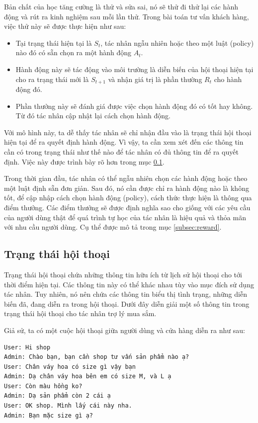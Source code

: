 Bản chất của học tăng cường là thử và sửa sai, nó sẽ thử đi thử lại các hành động và rút ra kinh nghiệm sau mỗi lần thử. Trong bài toán tư vấn khách hàng, việc thử này sẽ được thực hiện như sau:

\begin{itemize}
    \item Tại trạng thái hiện tại là $S_t$, tác nhân ngẫu nhiên hoặc theo một luật (policy) nào đó có sẵn chọn ra một hành động $A_t$.
    \item Hành động này sẽ tác động vào môi trường là diễn biến của hội thoại hiện tại cho ra trạng thái mới là $S_{t+1}$ và nhận giá trị là phần thường $R_t$ cho hành động đó.
    \item Phần thưởng này sẽ đánh giá được việc chọn hành động đó có tốt hay không. Từ đó tác nhân cập nhật lại cách chọn hành động.
\end{itemize}

Với mô hình này, ta dễ thấy tác nhân sẽ chỉ nhận đầu vào là trạng thái hội thoại hiện tại để ra quyết định hành động. Vì vậy, ta cần xem xét đến các thông tin cần có trong trạng thái như thế nào để tác nhân có đủ thông tin để ra quyết định. Việc này được trình bày rõ hơn trong mục \ref{subsec:state}.

Trong thời gian đầu, tác nhân có thể ngẫu nhiên chọn các hành động hoặc theo một luật định sẵn đơn giản. Sau đó, nó cần được chỉ ra hành động nào là không tốt, để cập nhập cách chọn hành động (policy), cách thức thực hiện là thông qua điểm thưởng. Các điểm thưởng sẽ được định nghĩa sao cho giống với các yêu cầu của người dùng thật để quá trình tự học của tác nhân là hiệu quả và thỏa mãn với nhu cầu người dùng. Cụ thể được mô tả trong mục \ref{subsec:reward}.

\subsection{Trạng thái hội thoại}
\label{subsec:state}
Trạng thái hội thoại chứa những thông tin hữu ích từ lịch sử hội thoại cho tới thời điểm hiện tại. Các thông tin này có thể khác nhau tùy vào mục đích sử dụng tác nhân. Tuy nhiên, nó nên chứa các thông tin biểu thị tình trạng, những diễn biến đã, đang diễn ra trong hội thoại. Dưới đây diễn giải một số thông tin trong trạng thái hội thoại cho tác nhân trợ lý mua sắm.

Giả sử, ta có một cuộc hội thoại giữa người dùng và cửa hàng diễn ra như sau:

\renewcommand{\lstlistingname}{Ví dụ}
\begin{lstlisting}[caption={Một mẫu đoạn hội thoại},label={exam:dialog1},language=exam_vn,firstnumber=1]
User: Hi shop
Admin: Chào bạn, bạn cần shop tư vấn sản phẩm nào ạ?
User: Chân váy hoa có size gì vậy bạn
Admin: Dạ chân váy hoa bên em có size M, và L ạ
User: Còn màu hồng ko?
Admin: Dạ sản phẩm còn 2 cái ạ
User: OK shop. Mình lấy cái này nha.
Admin: Bạn mặc size gì ạ?
\end{lstlisting}

